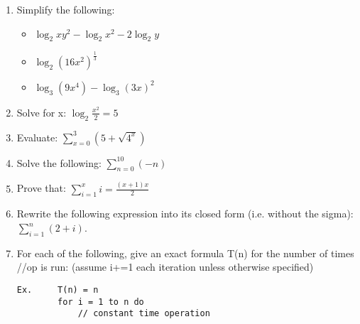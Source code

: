 \documentclass[11pt]{article}
\begin{document}
\begin{enumerate}[leftmargin=*]
\item Simplify the following: 
\begin{itemize}
    \item \( \log_2 xy^2 - \log_2 x^2 - 2 \log_2 y \)
    \item \( \log_2 (16x^2)^\frac{1}{3} \)
    \item \( \log_3(9x^4) - \log_3(3x)^2\)
\end{itemize}


\item Solve for x: \( \log_{2} \frac{x^2}{2} = 5 \)

\item Evaluate: \( \sum\limits_{x=0}^3 (5 + \sqrt{4^x}) \)

\item Solve the following: \( \sum\limits_{n=0}^{10} (-n) \)


\item Prove that: \( \sum\limits_{i=1}^{x} i = \frac{(x + 1)x}{2} \)

\item Rewrite the following expression into its closed form (i.e. without the sigma): \( \sum_{i=1}^n (2 + i) \).


\item For each of the following, give an exact formula T(n) for the number of times //op is run: 
(assume i+=1 each iteration unless otherwise specified)


        \begin{verbatim}
Ex.     T(n) = n
        for i = 1 to n do
            // constant time operation
        \end{verbatim}
        

\end{enumerate}
\end{document}
